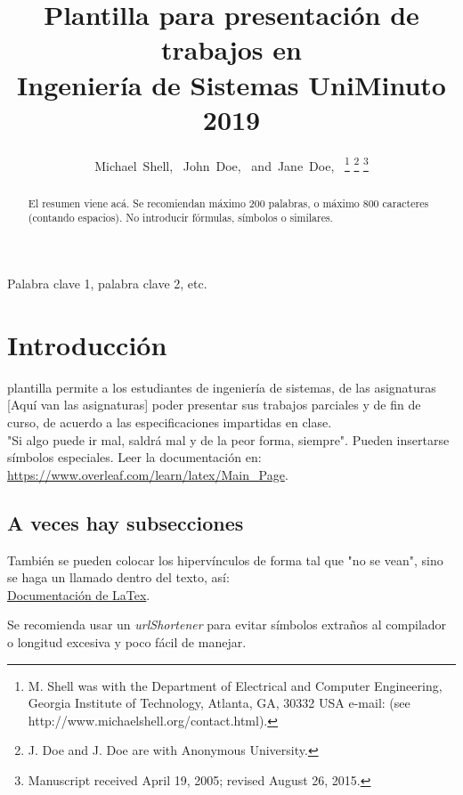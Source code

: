 \documentclass[journal]{IEEEtran}
\begin{document}
\title{Plantilla para presentación de trabajos en\\ Ingeniería de Sistemas UniMinuto 2019}

\author{Michael~Shell,~
        John~Doe,~
        and~Jane~Doe,~%
\thanks{M. Shell was with the Department
of Electrical and Computer Engineering, Georgia Institute of Technology, Atlanta,
GA, 30332 USA e-mail: (see http://www.michaelshell.org/contact.html).}%
\thanks{J. Doe and J. Doe are with Anonymous University.}%
\thanks{Manuscript received April 19, 2005; revised August 26, 2015.}}


\maketitle

\begin{abstract}
El resumen viene acá. Se recomiendan máximo 200 palabras, o máximo 800 caracteres (contando espacios). No introducir fórmulas, símbolos o similares.
\end{abstract}

\begin{IEEEkeywords}
Palabra clave 1, palabra clave 2, etc.
\end{IEEEkeywords}

\section{Introducción}

 plantilla permite a los estudiantes de ingeniería de sistemas, de las asignaturas [Aquí van las asignaturas] poder presentar sus trabajos parciales y de fin de curso, de acuerdo a las especificaciones impartidas en clase.\\
"Si algo puede ir mal, saldrá mal y de la peor forma, siempre".
Pueden insertarse símbolos especiales. Leer la documentación en:  \url{https://www.overleaf.com/learn/latex/Main_Page}.

\subsection{A veces hay subsecciones}
También se pueden colocar los hipervínculos de forma tal que "no se vean", sino se haga un llamado dentro del texto, así:\\
\href{https://www.overleaf.com/learn/latex/Main_Page}{Documentación de LaTex}.\par
Se recomienda usar un \emph{urlShortener} para evitar símbolos extraños al compilador o longitud excesiva y poco fácil de manejar.
\end{document}
